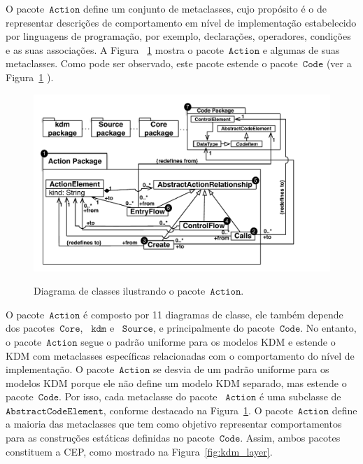 O pacote~$\mathtt{Action}$ define um conjunto de metaclasses, cujo propósito é o de representar descrições de comportamento em nível de implementação estabelecido por linguagens de programação, por exemplo, declarações, operadores, condições e as suas associações. A Figura ~\ref{fig:actionModel}  mostra o pacote~$\mathtt{Action}$ e algumas de suas metaclasses. Como pode ser observado, este pacote estende o pacote~$\mathtt{Code}$ (ver a Figura~\ref {fig:actionModel} ).


\begin{figure}[!ht]
	\centering
	\caption{Diagrama de classes ilustrando o pacote~$\mathtt{Action}$.}
	\includegraphics[scale=0.67]{images/ActionModel_Class_Diagram}
	\label{fig:actionModel}
\end{figure}

O pacote~$\mathtt{Action}$ é composto por 11 diagramas de classe, ele também depende dos pacotes~$\mathtt{Core}$, ~$\mathtt{kdm}$ e ~$\mathtt{Source}$, e  principalmente do pacote~$\mathtt{Code}$. No entanto, o pacote~$\mathtt{Action}$ segue o padrão uniforme para os modelos KDM e estende o KDM com metaclasses específicas relacionadas com o comportamento do nível de implementação. O pacote~$\mathtt{Action}$ se desvia de um padrão uniforme para os modelos KDM porque ele não define um modelo KDM separado, mas estende o pacote~$\mathtt{Code}$.  Por isso, cada metaclasse do pacote ~$\mathtt{Action}$ é uma subclasse de~$\mathtt{AbstractCodeElement}$, conforme destacado na Figura~\ref{fig:actionModel}. O pacote~$\mathtt{Action}$ define a maioria das metaclasses que tem como objetivo representar comportamentos para as construções estáticas definidas no pacote~$\mathtt{Code}$. Assim, ambos pacotes constituem a CEP, como mostrado na Figura~\ref{fig:kdm_layer}.

